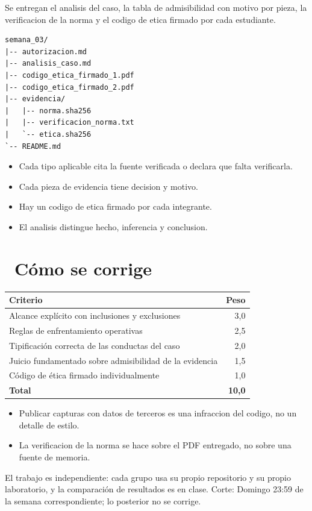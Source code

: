 \documentclass[11pt,a4paper]{article}
\newcommand{\iconotexto}[2]{\textcolor{cyanNeon}{\faIcon{#1}}~#2}
\begin{document}
Se entregan el analisis del caso, la tabla de admisibilidad con motivo por pieza, la verificacion de la norma y el codigo de etica firmado por cada estudiante.

\begin{lstlisting}[style=estiloCodigo]
semana_03/
|-- autorizacion.md
|-- analisis_caso.md
|-- codigo_etica_firmado_1.pdf
|-- codigo_etica_firmado_2.pdf
|-- evidencia/
|   |-- norma.sha256
|   |-- verificacion_norma.txt
|   `-- etica.sha256
`-- README.md
\end{lstlisting}

\begin{itemize}[leftmargin=1.4em,itemsep=2pt,topsep=3pt]
  \item Cada tipo aplicable cita la fuente verificada o declara que falta verificarla.
  \item Cada pieza de evidencia tiene decision y motivo.
  \item Hay un codigo de etica firmado por cada integrante.
  \item El analisis distingue hecho, inferencia y conclusion.
\end{itemize}

\section{\iconotexto{ruler-combined}{Cómo se corrige}}

\begin{tabularx}{\linewidth}{@{}X r@{}}
\toprule
Criterio & Peso\\
\midrule
Alcance explícito con inclusiones y exclusiones & 3,0 \\
Reglas de enfrentamiento operativas & 2,5 \\
Tipificación correcta de las conductas del caso & 2,0 \\
Juicio fundamentado sobre admisibilidad de la evidencia & 1,5 \\
Código de ética firmado individualmente & 1,0 \\
\midrule
\textbf{Total} & \textbf{10,0}\\
\bottomrule
\end{tabularx}

\begin{itemize}[leftmargin=1.4em,itemsep=2pt,topsep=3pt]
  \item Publicar capturas con datos de terceros es una infraccion del codigo, no un detalle de estilo.
  \item La verificacion de la norma se hace sobre el PDF entregado, no sobre una fuente de memoria.
\end{itemize}

\begin{cajaRecuerda}El trabajo es independiente: cada grupo usa su propio repositorio y su propio laboratorio, y la comparación de resultados es en clase. Corte: Domingo 23:59 de la semana correspondiente; lo posterior no se corrige.
\end{cajaRecuerda}
\end{document}
